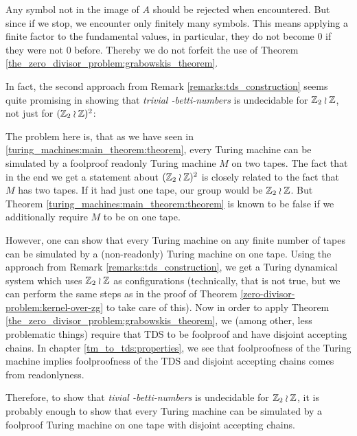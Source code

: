 \begin{Remark}
	Any symbol not in the image of $A$ should be rejected when encountered.
	But since if we stop, we encounter only finitely many symbols.
	This means applying a finite factor to the fundamental values, in particular, they do not become $0$ if they were not $0$ before.
	Thereby we do not forfeit the use of Theorem \ref{the_zero_divisor_problem:grabowskis_theorem}.
\end{Remark}

\begin{Remark}
	In fact, the second approach from Remark \ref{remarks:tds_construction} seems quite promising in showing that \emph{trivial \ltwo-betti-numbers} is undecidable for $\mathbb{Z}_2 \wr \mathbb{Z}$, not just for $(\mathbb{Z}_2 \wr \mathbb{Z})^2$:

	The problem here is, that as we have seen in \ref{turing_machines:main_theorem:theorem}, every Turing machine can be simulated by a foolproof readonly Turing machine $M$ on two tapes.
	The fact that in the end we get a statement about $(\mathbb{Z}_2 \wr \mathbb{Z})^2$ is closely related to the fact that $M$ has two tapes.
	If it had just one tape, our group would be $\mathbb{Z}_2 \wr \mathbb{Z}$.
	But Theorem \ref{turing_machines:main_theorem:theorem} is known to be false if we additionally require $M$ to be on one tape.

	However, one can show that every Turing machine on any finite number of tapes can be simulated by a (non-readonly) Turing machine on one tape.
	Using the approach from Remark \ref{remarks:tds_construction}, we get a Turing dynamical system which uses $\mathbb{Z}_2 \wr \mathbb{Z}$ as configurations (technically, that is not true, but we can perform the same steps as in the proof of Theorem \ref{zero-divisor-problem:kernel-over-zg} to take care of this).
	Now in order to apply Theorem \ref{the_zero_divisor_problem:grabowskis_theorem}, we (among other, less problematic things) require that TDS to be foolproof and have disjoint accepting chains.
	In chapter \ref{tm_to_tds:properties}, we see that foolproofness of the Turing machine implies foolproofness of the TDS and disjoint accepting chains comes from readonlyness.

	Therefore, to show that \emph{tivial \ltwo-betti-numbers} is undecidable for $\mathbb{Z}_2 \wr \mathbb{Z}$, it is probably enough to show that every Turing machine can be simulated by a foolproof Turing machine on one tape with disjoint accepting chains.


\end{Remark}
